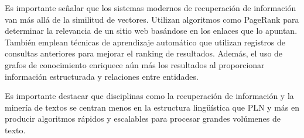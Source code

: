 Es importante señalar que los sistemas modernos de recuperación de información van más allá de la similitud de vectores. Utilizan algoritmos como PageRank \cite{page1998pagerank} para determinar la relevancia de un sitio web basándose en los enlaces que lo apuntan. También emplean técnicas de aprendizaje automático que utilizan registros de consultas anteriores para mejorar el ranking de resultados. Además, el uso de grafos de conocimiento enriquece aún más los resultados al proporcionar información estructurada y relaciones entre entidades.

Es importante destacar que disciplinas como la recuperación de información y la minería de textos se centran menos en la estructura lingüística que PLN y más en producir algoritmos rápidos y escalables para procesar grandes volúmenes de texto.

